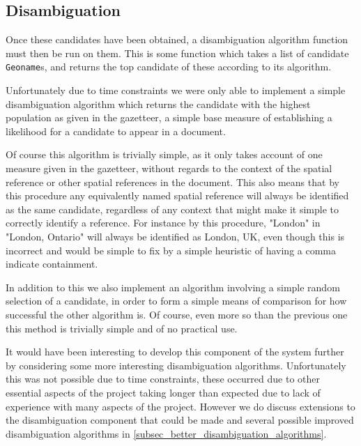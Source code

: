\documentclass[12pt, a4paper]{report}
\begin{document}

\subsection{Disambiguation}

Once these candidates have been obtained, a disambiguation algorithm function must then be run on them. This is some function which takes a list of candidate \verb#Geoname#s, and returns the top candidate of these according to its algorithm.

Unfortunately due to time constraints we were only able to implement a simple disambiguation algorithm which returns the candidate with the highest population as given in the gazetteer, a simple base measure of establishing a likelihood for a candidate to appear in a document.

Of course this algorithm is trivially simple, as it only takes account of one measure given in the gazetteer, without regards to the context of the spatial reference or other spatial references in the document. This also means that by this procedure any equivalently named spatial reference will always be identified as the same candidate, regardless of any context that might make it simple to correctly identify a reference. For instance by this procedure, "London" in "London, Ontario" will always be identified as London, UK, even though this is incorrect and would be simple to fix by a simple heuristic of having a comma indicate containment.

In addition to this we also implement an algorithm involving a simple random selection of a candidate, in order to form a simple means of comparison for how successful the other algorithm is. Of course, even more so than the previous one this method is trivially simple and of no practical use.

It would have been interesting to develop this component of the system further by considering some more interesting disambiguation algorithms. Unfortunately this was not possible due to time constraints, these occurred due to other essential aspects of the project taking longer than expected due to lack of experience with many aspects of the project. However we do discuss extensions to the disambiguation component that could be made and several possible improved disambiguation algorithms in \ref{subsec_better_disambiguation_algorithms}.
\end{document}
